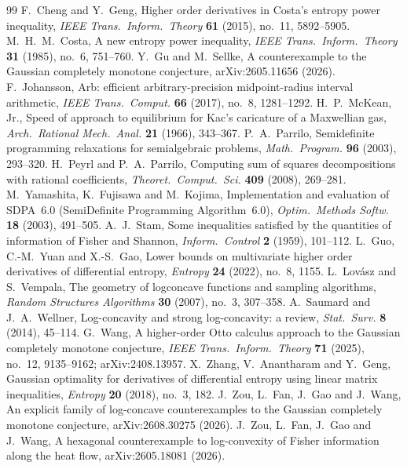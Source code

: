 \documentclass[11pt]{article}
\theoremstyle{definition}
\theoremstyle{remark}
\begin{document}
\begin{thebibliography}{99}
 F.~Cheng and Y.~Geng, Higher order derivatives in Costa's
entropy power inequality, \emph{IEEE Trans.\ Inform.\ Theory} \textbf{61} (2015),
no.~11, 5892--5905.
 M.~H.~M.~Costa, A new entropy power inequality,
\emph{IEEE Trans.\ Inform.\ Theory} \textbf{31} (1985), no.~6, 751--760.
 Y.~Gu and M.~Sellke, A counterexample to the Gaussian completely
monotone conjecture, arXiv:2605.11656 (2026).
 F.~Johansson, Arb: efficient arbitrary-precision
midpoint-radius interval arithmetic, \emph{IEEE Trans.\ Comput.} \textbf{66} (2017),
no.~8, 1281--1292.
 H.~P.~McKean, Jr., Speed of approach to equilibrium for Kac's
caricature of a Maxwellian gas, \emph{Arch.\ Rational Mech.\ Anal.} \textbf{21}
(1966), 343--367.
 P.~A.~Parrilo, Semidefinite programming relaxations for
semialgebraic problems, \emph{Math.\ Program.} \textbf{96} (2003), 293--320.
 H.~Peyrl and P.~A.~Parrilo, Computing sum of squares
decompositions with rational coefficients, \emph{Theoret.\ Comput.\ Sci.}
\textbf{409} (2008), 269--281.
 M.~Yamashita, K.~Fujisawa and M.~Kojima, Implementation and
evaluation of SDPA~6.0 (SemiDefinite Programming Algorithm~6.0),
\emph{Optim.\ Methods Softw.} \textbf{18} (2003), 491--505.
 A.~J.~Stam, Some inequalities satisfied by the quantities of
information of Fisher and Shannon, \emph{Inform.\ Control} \textbf{2} (1959), 101--112.
 L.~Guo, C.-M.~Yuan and X.-S.~Gao, Lower bounds on multivariate
higher order derivatives of differential entropy, \emph{Entropy} \textbf{24} (2022),
no.~8, 1155.
 L.~Lov\'asz and S.~Vempala, The geometry of logconcave functions and
sampling algorithms, \emph{Random Structures Algorithms} \textbf{30} (2007), no.~3,
307--358.
 A.~Saumard and J.~A.~Wellner, Log-concavity and strong
log-concavity: a review, \emph{Stat.\ Surv.} \textbf{8} (2014), 45--114.
 G.~Wang, A higher-order Otto calculus approach to the Gaussian
completely monotone conjecture, \emph{IEEE Trans.\ Inform.\ Theory} \textbf{71}
(2025), no.~12, 9135--9162; arXiv:2408.13957.
 X.~Zhang, V.~Anantharam and Y.~Geng, Gaussian optimality for
derivatives of differential entropy using linear matrix inequalities,
\emph{Entropy} \textbf{20} (2018), no.~3, 182.
 J.~Zou, L.~Fan, J.~Gao and J.~Wang, An explicit family of
log-concave counterexamples to the Gaussian completely monotone conjecture,
arXiv:2608.30275 (2026).
 J.~Zou, L.~Fan, J.~Gao and J.~Wang, A hexagonal counterexample to
log-convexity of Fisher information along the heat flow, arXiv:2605.18081 (2026).
\end{thebibliography}
\end{document}
